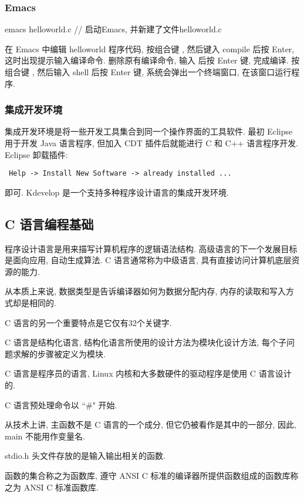 \subsubsection{Emacs}
\begin{shell}
 emacs helloworld.c // 启动Emacs, 并新建了文件helloworld.c
\end{shell}
在 Emacs 中编辑 helloworld 程序代码, 按组合键 , 然后键入 compile 后按 Enter,
这时出现提示输入编译命令. 删除原有编译命令, 输入 
后按 Enter 键, 完成编译. 按组合键 , 然后输入 shell 后按 Enter 键, 
系统会弹出一个终端窗口, 在该窗口运行程序.

\subsubsection{集成开发环境}
集成开发环境是将一些开发工具集合到同一个操作界面的工具软件.
最初 Eclipse 用于开发 Java 语言程序, 但加入 CDT 插件后就能进行 C 和 C++ 语言程序开发.
Eclipse 卸载插件: 
\begin{verbatim}
 Help -> Install New Software -> already installed ...
\end{verbatim}
即可.
Kdevelop 是一个支持多种程序设计语言的集成开发环境.


\subsection{C 语言编程基础}
程序设计语言是用来描写计算机程序的逻辑语法结构. 高级语言的下一个发展目标是面向应用, 
自动生成算法. C 语言通常称为中级语言, 具有直接访问计算机底层资源的能力. 

从本质上来说, 数据类型是告诉编译器如何为数据分配内存, 内存的读取和写入方式却是相同的.

C 语言的另一个重要特点是它仅有32个关键字.

C 语言是结构化语言, 结构化语言所使用的设计方法为模块化设计方法, 每个子问题求解的步骤被定义为模块.

C 语言是程序员的语言, Linux 内核和大多数硬件的驱动程序是使用 C 语言设计的.

C 语言预处理命令以 ``\#" 开始.

从技术上讲, 主函数不是 C 语言的一个成分, 但它仍被看作是其中的一部分, 因此, main 不能用作变量名.

stdio.h 头文件存放的是输入输出相关的函数.

函数的集合称之为函数库, 遵守 ANSI C 标准的编译器所提供函数组成的函数库称之为 ANSI C 标准函数库.

